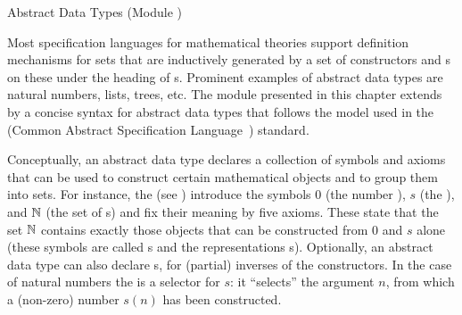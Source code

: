 
\begin{tchapter}[id=adt,short=Abstract Data Types]{Abstract Data Types (Module {})}

  Most specification languages for mathematical theories support definition mechanisms for
  sets that are inductively generated by a set of constructors and
  {s} on these under the heading of {s}. Prominent examples of abstract data types are natural numbers, lists,
  trees, etc. The module {} presented in this chapter extends {\omdoc} by
  a concise syntax for abstract data types that follows the model used in the {\casl}
  (Common Abstract Specification Language~\cite{CoFI:2004:CASL-RM}) standard.

  Conceptually, an abstract data type declares a collection of symbols and axioms that can
  be used to construct certain mathematical objects and to group them into sets. For
  instance, the {} (see {}) introduce the symbols
  $0$ (the number {}), $s$ (the {}), and ${\mathbb{N}}$
  (the set of {s}) and fix their meaning by five axioms. These
  state that the set ${\mathbb{N}}$ contains exactly those objects that can be constructed from $0$
  and $s$ alone (these symbols are called {s} and the
  representations {s}). Optionally, an abstract data type can
  also declare {s}, for (partial) inverses of the
  constructors. In the case of natural numbers the {} is a
  selector for $s$: it ``selects'' the argument $n$, from which a (non-zero) number $s(n)$
  has been constructed.


\end{tchapter}
